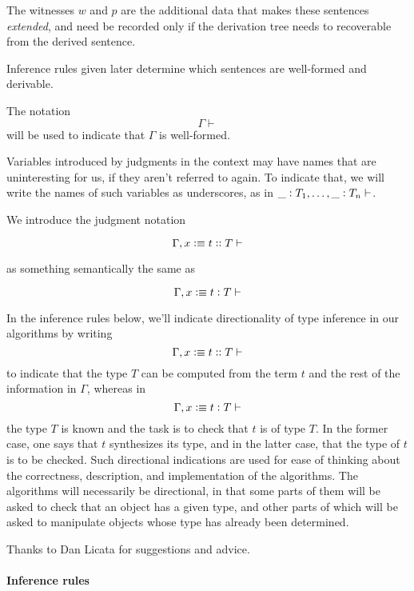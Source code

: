 \documentclass[11pt]{article}
\newcommand{\ccolon}[1]{\vcentcolon#1}
\newcommand{\ccheck}[1]{\vcentcolon#1}  %
\newcommand{\csynth}[1]{\vcentcolon\vcentcolon #1} %
\newcommand{\Okay}{\mathop{\text{ \sc okay}}}
\newcommand{\Context}{\vdash\Okay}
\renewcommand{\Context}{\vdash}
\newcommand{\var}{\char`_}
\newcommand{\defn}{\vcentcolon\equiv}
\begin{document}
The witnesses $w$ and $p$ are the additional data that makes these sentences
{\em extended}, and need be recorded only if the derivation tree needs to
recoverable from the derived sentence.

Inference rules given later determine which sentences are well-formed and
derivable.

The notation $$\Gamma \Context$$ will be used to indicate that $\Gamma$ is
well-formed.

Variables introduced by judgments in the context may have names that are
uninteresting for us, if they aren't referred to again.  To indicate that, we
will write the names of such variables as underscores, as in $\var
\ccolon{T_1},\dots,\var \ccolon{T_n}\Context$.

We introduce the judgment notation

$$ \Gamma, x \defn t \csynth{T} \Context $$

as something semantically the same as

$$ \Gamma, x \defn t \ccolon{T} \Context $$

In the inference rules below, we'll indicate directionality of type inference
in our algorithms by writing
$$\Gamma, x \defn t \csynth{T} \Context$$ to indicate that the type $T$ can
be computed from the term $t$ and the rest of the information in $\Gamma$,
whereas in $$\Gamma, x \defn t \ccheck{T} \Context$$ the type $T$ is known
and the task is to check that $t$ is of type $T$.  In the former case, one says
that $t$ synthesizes its type, and in the latter case, that the type of $t$ is
to be checked.  Such directional indications are used for ease of thinking
about the correctness, description, and implementation of the algorithms.  The
algorithms will necessarily be directional, in that some parts of them will be
asked to check that an object has a given type, and other parts of which will
be asked to manipulate objects whose type has already been determined.

Thanks to Dan Licata for suggestions and advice.

\paragraph{Inference rules} 
\end{document}

